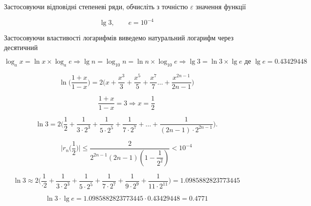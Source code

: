 Застосовуючи відповідні степеневі ряди, обчисліть з точністю $\varepsilon$ значення функції

$$
  \lg 3, {\qquad}e=10^{-4}
$$

Застосовуючи властивості логарифмів виведемо натуральний логарифм через десятичний

$$
\boxed{ \log_{a} x = \ln{x} \times \log_{a} e }
\Rightarrow
\boxed{ \lg {n} = \log_{10} {n} = \ln{n} \times \log_{10} e }
\Rightarrow
\boxed{ \lg {3} = \ln {3} \times \lg e } {\text{ де }} {\lg e = 0.43429448}
$$


$$
\ln{\Bigg( \dfrac{1+x}{1-x} \Bigg)}
= 2\Bigg( x + \dfrac{x^3}{3} + \dfrac{x^5}{5} + \dfrac{x^7}{7} \ldots + \dfrac{x^{2n-1}}{2n-1} \Bigg)
$$

$$
\dfrac{1+x}{1-x} = 3 \Rightarrow x = \dfrac{1}{2}
$$


$$
\ln{3} = 2 \Bigg( \dfrac{1}{2} + \dfrac{1}{3 \cdot 2^3 } + \dfrac{1}{5 \cdot 2^5} + \dfrac{1}{7 \cdot 2^7 }  + \ldots + \dfrac{1}{(2n-1) \cdot 2^{2n-1}}\Bigg).
$$


$$
\bigg | r_n\Big( \dfrac{1}{2} \Big) \bigg | \leqslant \dfrac{2}{2^{2n-1} (2n-1)(1-\dfrac{1}{2^2})}  < 10^{-4}
$$


$$
\ln{3} \approx 2 \Big(
\dfrac{1}{\cdot 2 } + \dfrac{1}{3 \cdot 2^3 } +
 \dfrac{1}{5 \cdot 2^5 } + \dfrac{1}{7 \cdot 2^7 } +
 \dfrac{1}{9 \cdot 2^9 } + \dfrac{1}{11 \cdot 2^{11} }
\Big) = 1.0985882823773445
$$

$$\ln{3} \cdot \lg e = 1.0985882823773445 \cdot 0.43429448 = \boxed{ 0.4771 }$$

